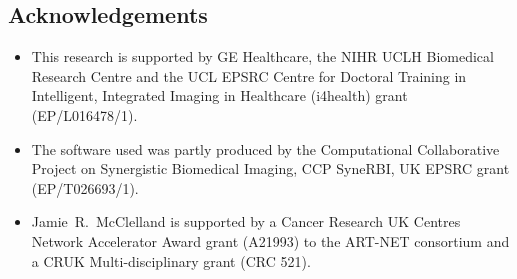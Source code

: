 \documentclass[misc, color=UCLburgundy, margin=1cm]{uclposter}
\begin{document}
\begin{multicols}{4}
        \AtNextBibliography{\small}
        \printbibliography
        
        \small
        \section*{Acknowledgements}
            \begin{itemize}
                \item This research is supported by GE Healthcare, the NIHR UCLH Biomedical Research Centre and the UCL EPSRC Centre for Doctoral Training in Intelligent, Integrated Imaging in Healthcare (i4health) grant (EP/L016478/1).
                \item The software used was partly produced by the Computational Collaborative Project on Synergistic Biomedical Imaging, CCP SyneRBI, UK EPSRC grant (EP/T026693/1).
                \item Jamie~R.~McClelland is supported by a Cancer Research UK Centres Network Accelerator Award grant (A21993) to the ART-NET consortium and a CRUK Multi-disciplinary grant (CRC 521).
            \end{itemize}
    \end{multicols}
\end{document}

